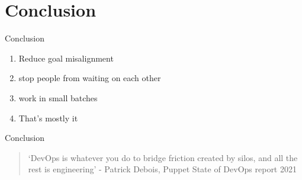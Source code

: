 \documentclass{beamer}
\begin{document}
	\section{Conclusion}
	\begin{frame}{Conclusion}
		\begin{enumerate}
			\item Reduce goal misalignment \pause
			\item stop people from waiting on each other \pause 
			\item work in small batches \pause
			\item That's mostly it
			
		\end{enumerate}
	\end{frame}
	\begin{frame}{Conclusion}
		\begin{quote}
			`DevOps is whatever you do to bridge friction created by silos, and all the rest is engineering' - Patrick Debois, Puppet State of DevOps report 2021
		\end{quote}
	\end{frame}
\end{document}
